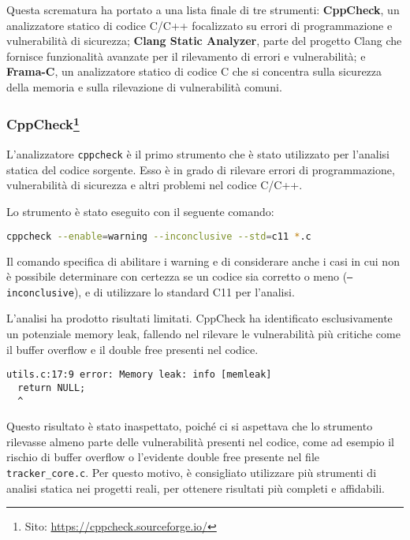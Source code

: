 Questa scrematura ha portato a una lista finale di tre strumenti: \textbf{CppCheck},
un analizzatore statico di codice C/C++ focalizzato su errori di programmazione e
vulnerabilità di sicurezza; \textbf{Clang Static Analyzer}, parte del progetto
Clang che fornisce funzionalità avanzate per il rilevamento di errori e
vulnerabilità; e \textbf{Frama-C}, un analizzatore statico di codice C che si concentra
sulla sicurezza della memoria e sulla rilevazione di vulnerabilità comuni.

\medskip
\subsubsection*{\small CppCheck\footnote{Sito: \url{https://cppcheck.sourceforge.io/}}}
L'analizzatore \texttt{cppcheck} è il primo strumento che è stato utilizzato per
l'analisi statica del codice sorgente. Esso è in grado di rilevare errori di programmazione,
vulnerabilità di sicurezza e altri problemi nel codice C/C++.

\noindent
Lo strumento è stato eseguito con il seguente comando: \begin{lstlisting}[language=bash, numbers=none]
cppcheck --enable=warning --inconclusive --std=c11 *.c
\end{lstlisting}
Il comando specifica di abilitare i warning e di considerare anche i casi in cui
non è possibile determinare con certezza se un codice sia corretto o meno (\texttt{--inconclusive}),
e di utilizzare lo standard C11 per l'analisi.

L'analisi ha prodotto risultati limitati. CppCheck ha identificato
esclusivamente un potenziale memory leak, fallendo nel rilevare le vulnerabilità
più critiche come il buffer overflow e il double free presenti nel codice.

\begin{lstlisting}[language={}, numbers=none]
utils.c:17:9 error: Memory leak: info [memleak]
  return NULL;
  ^
\end{lstlisting}

Questo risultato è stato inaspettato, poiché ci si aspettava che lo strumento rilevasse
almeno parte delle vulnerabilità presenti nel codice, come ad esempio il rischio
di buffer overflow o l'evidente double free presente nel file \texttt{tracker\_core.c}.
Per questo motivo, è consigliato utilizzare più strumenti di analisi statica nei
progetti reali, per ottenere risultati più completi e affidabili.

\medskip


